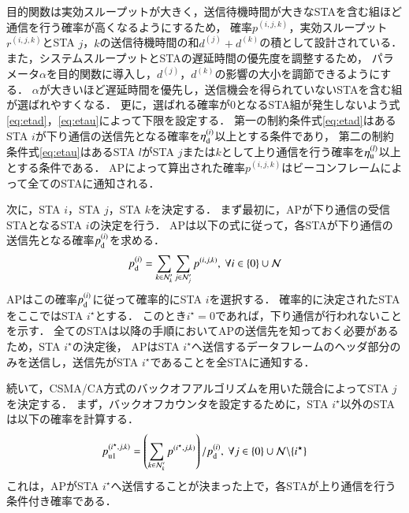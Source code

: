 \documentclass[technicalreport]{ieicej}
\newcommand{\pijk}{p^{(i,j,k)}}
\newcommand{\rijk}{r^{(i,j,k)}}
\newcommand{\mthnj}{{\mathcal N}'_j}
\newcommand{\mthnk}{{\mathcal N}'_k}
\begin{document}
			\par
			目的関数は実効スループットが大きく，送信待機時間が大きなSTAを含む組ほど通信を行う確率が高くなるようにするため，
			確率$\pijk$，実効スループット$\rijk$とSTA $j$，$k$の送信待機時間の和$d^{(j)}+d^{(k)}$の積として設計されている．
			また，システムスループットとSTAの遅延時間の優先度を調整するため，
			パラメータ$\alpha$を目的関数に導入し，$d^{(j)}$，$d^{(k)}$の影響の大小を調節できるようにする．
			$\alpha$が大きいほど遅延時間を優先し，送信機会を得られていないSTAを含む組が選ばれやすくなる．
			更に，選ばれる確率が0となるSTA組が発生しないよう式\eqref{eq:etad}，\eqref{eq:etau}によって下限を設定する．
			第一の制約条件式\eqref{eq:etad}はあるSTA $i$が下り通信の送信先となる確率を$\eta_{\rm d}^{(i)}$以上とする条件であり，
			第二の制約条件式\eqref{eq:etau}はあるSTA $l$がSTA $j$または$k$として上り通信を行う確率を$\eta_{\rm u}^{(l)}$以上とする条件である．
			APによって算出された確率$\pijk$はビーコンフレームによって全てのSTAに通知される．
			\par
			次に，STA $i$，STA $j$，STA $k$を決定する．
			まず最初に，APが下り通信の受信STAとなるSTA $i$の決定を行う．
			APは以下の式に従って，各STAが下り通信の送信先となる確率$p_{\rm d}^{(i)}$を求める．
			\begin{equation}
				p_{\rm d}^{(i)}= \sum_{k\in\mthnk}\sum_{j\in\mthnj}p^{(i,j,k)}, \ \forall i \in \{0\}\cup{\mathcal N}
			\end{equation}
			APはこの確率$p_{\rm d}^{(i)}$に従って確率的にSTA $i$を選択する．
			確率的に決定されたSTAをここではSTA $i^{\star}$とする．
			このとき$i^{\star}=0$であれば，下り通信が行われないことを示す．
			全てのSTAは以降の手順においてAPの送信先を知っておく必要があるため，STA $i^{\star}$の決定後，
			APはSTA $i^{\star}$へ送信するデータフレームのヘッダ部分のみを送信し，送信先がSTA $i^{\star}$であることを全STAに通知する．
			\par
			続いて，CSMA/CA方式のバックオフアルゴリズムを用いた競合によってSTA $j$を決定する．
			まず，バックオフカウンタを設定するために，STA $i^{\star}$以外のSTAは以下の確率を計算する．
			\begin{align}
				p_{\rm u1}^{(i^{\star},j,k)}=\left(\sum_{k\in\mthnk} p^{(i^{\star},j,k)}\right) / p_{\rm d}^{(i)},\ \forall j \in \{0\}\cup{\mathcal N}\backslash \{i^{\star}\}
			\end{align}
			これは，APがSTA $i^{\star}$へ送信することが決まった上で，各STAが上り通信を行う条件付き確率である．
\end{document}
